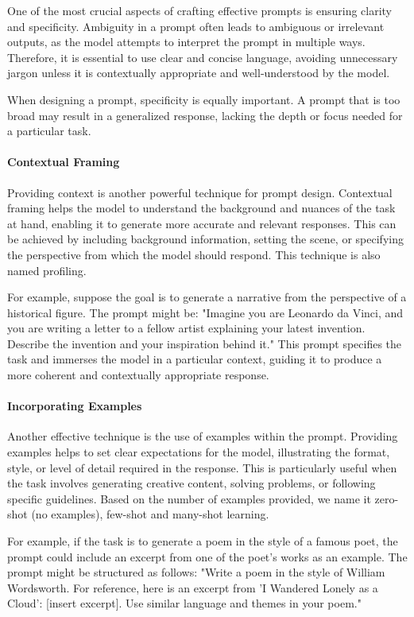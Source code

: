 One of the most crucial aspects of crafting effective prompts is ensuring clarity and specificity. Ambiguity in a prompt often leads to ambiguous or irrelevant outputs, as the model attempts to interpret the prompt in multiple ways. Therefore, it is essential to use clear and concise language, avoiding unnecessary jargon unless it is contextually appropriate and well-understood by the model.

When designing a prompt, specificity is equally important. A prompt that is too broad may result in a generalized response, lacking the depth or focus needed for a particular task. 

\paragraph{Contextual Framing}

Providing context is another powerful technique for prompt design. Contextual framing helps the model to understand the background and nuances of the task at hand, enabling it to generate more accurate and relevant responses. This can be achieved by including background information, setting the scene, or specifying the perspective from which the model should respond. This technique is also named profiling.

For example, suppose the goal is to generate a narrative from the perspective of a historical figure. The prompt might be: "Imagine you are Leonardo da Vinci, and you are writing a letter to a fellow artist explaining your latest invention. Describe the invention and your inspiration behind it." This prompt specifies the task and immerses the model in a particular context, guiding it to produce a more coherent and contextually appropriate response.

\paragraph{Incorporating Examples}

Another effective technique is the use of examples within the prompt. Providing examples helps to set clear expectations for the model, illustrating the format, style, or level of detail required in the response. This is particularly useful when the task involves generating creative content, solving problems, or following specific guidelines. Based on the number of examples provided, we name it zero-shot (no examples), few-shot and many-shot learning. 

For example, if the task is to generate a poem in the style of a famous poet, the prompt could include an excerpt from one of the poet's works as an example. The prompt might be structured as follows: "Write a poem in the style of William Wordsworth. For reference, here is an excerpt from 'I Wandered Lonely as a Cloud': [insert excerpt]. Use similar language and themes in your poem."

